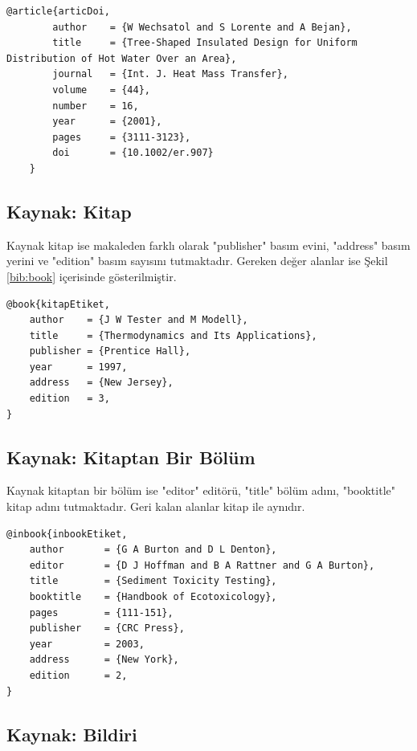 \begin{lstlisting}[language={[LaTeX]{TeX}}, label=bib:articleDOI, caption=Kaynak kabul edilmiş bir makale ise]
	@article{articDoi,
		author    = {W Wechsatol and S Lorente and A Bejan},
		title     = {Tree-Shaped Insulated Design for Uniform Distribution of Hot Water Over an Area},
		journal   = {Int. J. Heat Mass Transfer},
		volume    = {44},
		number    = 16,
		year      = {2001},
		pages     = {3111-3123},
		doi		  = {10.1002/er.907}
	}	
\end{lstlisting}


\subsection{Kaynak: Kitap}

Kaynak kitap ise makaleden farklı olarak "publisher" basım evini, "address" basım yerini ve "edition" basım sayısını tutmaktadır. Gereken değer alanlar ise Şekil \ref{bib:book} içerisinde gösterilmiştir.

\begin{lstlisting}[language={[LaTeX]{TeX}}, label=bib:book, caption=Kaynak bir kitap ise]
@book{kitapEtiket,
	author    = {J W Tester and M Modell}, 
	title     = {Thermodynamics and Its Applications},
	publisher = {Prentice Hall},
	year      = 1997,
	address   = {New Jersey},
	edition   = 3,
}
\end{lstlisting}

\subsection{Kaynak: Kitaptan Bir Bölüm}

Kaynak kitaptan bir bölüm ise "editor" editörü, "title" bölüm adını, "booktitle" kitap adını tutmaktadır. Geri kalan alanlar kitap ile aynıdır. 

\begin{lstlisting}[language={[LaTeX]{TeX}}, label=bib:inbook, caption=Kaynak kitaptan bölüm ise]
@inbook{inbookEtiket,
	author       = {G A Burton and D L Denton}, 
	editor       = {D J Hoffman and B A Rattner and G A Burton},
	title 	     = {Sediment Toxicity Testing},
	booktitle    = {Handbook of Ecotoxicology},
	pages        = {111-151},
	publisher    = {CRC Press},
	year         = 2003,
	address      = {New York},
	edition      = 2,
}
\end{lstlisting}


\subsection{Kaynak: Bildiri}

